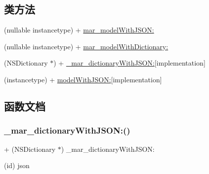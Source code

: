 \subsection*{类方法}
\begin{DoxyCompactItemize}
\item 
(nullable instancetype) + \hyperlink{category_n_s_object_07_m_a_r_model_08_a36ca2762b4bfa7401de70f8a87564406}{mar\+\_\+model\+With\+J\+S\+O\+N\+:}
\item 
(nullable instancetype) + \hyperlink{category_n_s_object_07_m_a_r_model_08_a4ce4c4b651072409b7feca71a77d2ed3}{mar\+\_\+model\+With\+Dictionary\+:}
\item 
(N\+S\+Dictionary $\ast$) + \hyperlink{category_n_s_object_07_m_a_r_model_08_aea6423eabd3f55c14b7c95d930a03da0}{\+\_\+mar\+\_\+dictionary\+With\+J\+S\+O\+N\+:}{\ttfamily  \mbox{[}implementation\mbox{]}}
\item 
(instancetype) + \hyperlink{category_n_s_object_07_m_a_r_model_08_a397b73668196517dd8d59b7f50b9affd}{model\+With\+J\+S\+O\+N\+:}{\ttfamily  \mbox{[}implementation\mbox{]}}
\end{DoxyCompactItemize}


\subsection{函数文档}
\mbox{\label{category_n_s_object_07_m_a_r_model_08_aea6423eabd3f55c14b7c95d930a03da0}} 
\subsubsection{\texorpdfstring{\+\_\+mar\+\_\+dictionary\+With\+J\+S\+O\+N\+:()}{\_mar\_dictionaryWithJSON:()}}
{\footnotesize\ttfamily + (N\+S\+Dictionary $\ast$) \+\_\+mar\+\_\+dictionary\+With\+J\+S\+O\+N\+: \begin{DoxyParamCaption}\item[{(id)}]{json }\end{DoxyParamCaption}\hspace{0.3cm}{\ttfamily [implementation]}}

\mbox{\label{category_n_s_object_07_m_a_r_model_08_a70ff93c534810af04782cf69a0c6c3fe}} 
